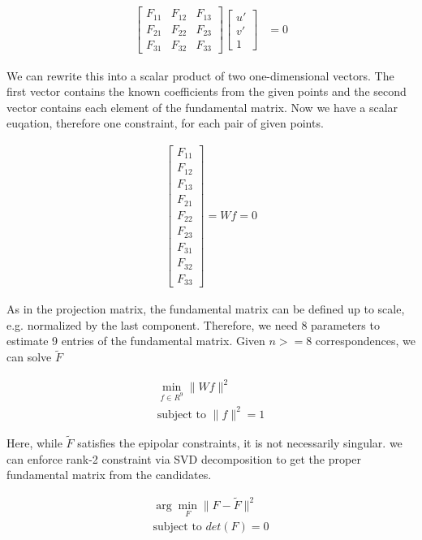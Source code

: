 \documentclass[twoside]{article}
\begin{document}
\begin{align}
[u, v, 1] \begin{bmatrix}
F_{11} & F_{12} & F_{13} \\
F_{21} & F_{22} & F_{23} \\
F_{31} & F_{32} & F_{33} 
\end{bmatrix} \begin{bmatrix}
u' \\ v' \\ 1
\end{bmatrix} &= 0
\end{align}

We can rewrite this into a scalar product of two one-dimensional vectors. The first vector contains the known coefficients from the given points and the second vector contains each element of the fundamental matrix. Now we have a scalar euqation, therefore one constraint, for each pair of given points.

\begin{align}
[uu', uv', u, vu', vv', v, u', v', 1]\begin{bmatrix}
F_{11} \\F_{12} \\F_{13} \\F_{21} \\F_{22} \\F_{23} \\F_{31} \\F_{32} \\F_{33}
\end{bmatrix} = Wf = 0
\end{align}

As in the projection matrix, the fundamental matrix can be defined up to scale, e.g. normalized by the last component. Therefore, we need 8 parameters to estimate 9 entries of the fundamental matrix. Given $n>=8$ correspondences, we can solve $\tilde{F}$

\begin{align}
\min_{f\in{R^9}}\|Wf\|^2 \\
\text{subject to } \|f\|^2 = 1
\end{align}

Here, while $\tilde{F}$ satisfies the epipolar constraints, it is not necessarily singular. we can enforce rank-2 constraint via SVD decomposition to get the proper fundamental matrix from the candidates.

\begin{align}
\arg\!\min_F \|F-\tilde{F}\|^2 \\
\text{subject to } det(F) = 0
\end{align}
\end{document}
